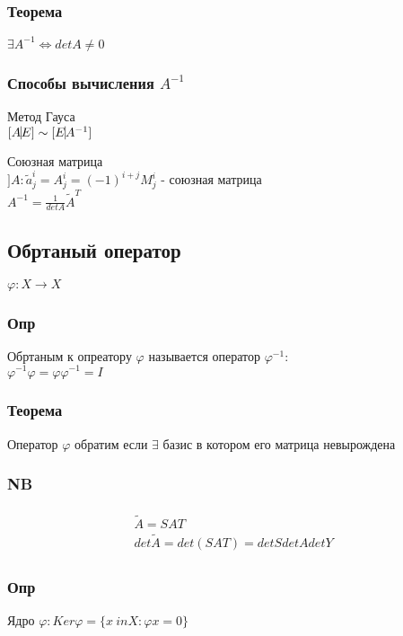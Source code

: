 \documentclass{article}
\begin{document}
\subsubsection{Теорема}
$\exists A^{-1} \Leftrightarrow det A \not = 0$

\subsubsection{Способы вычисления $A^{-1}$}
\begin{description}
\item Метод Гауса \\
  $[A \vline E] \sim [E \vline A^{-1}]$
\item Союзная матрица \\
  $] A : \tilde{a}^i_j = A^i_j = (-1)^{i+j}M^i_j$ - союзная матрица \\
  $A^{-1} = \frac{1}{det A}\tilde{A}^T$
\end{description}

\subsection{Обртаный оператор}
$\varphi : X \rightarrow X$
\subsubsection{Опр}
Обртаным к опреатору $\varphi$ называется оператор $\varphi^{-1}$: \\
$\varphi^{-1}\varphi = \varphi \varphi^{-1} = I$

\subsubsection{Теорема}
Оператор $\varphi$ обратим если $\exists$ базис в котором его матрица невырождена

\subsubsection{NB}
\begin{multline*}
\begin{aligned}
\tilde{A} = SAT \\
det \tilde{A} = det(SAT) = detS detA detY
\end{aligned}
\end{multline*}

\subsubsection{Опр}
Ядро $\varphi : Ker \varphi = \{x \ in X: \varphi x = 0\}$ 
\end{document}
